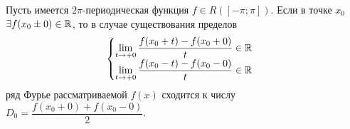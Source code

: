 \documentclass[../../main.tex]{subfiles}
\begin{document}
\begin{crl*}
	Пусть имеется $2\pi$-периодическая функция $f\in R([-\pi;\pi])$.
	Если в точке $x_0$ $\exists f(x_0 \pm 0) \in \mathbb{R}$, то в
	случае существования пределов
	\begin{equation}
		\label{18:12}
		\begin{cases}
			\lim\limits_{t \rightarrow +0}{\dfrac
				{f(x_0 + t) - f(x_0 + 0)}{t}} \in \mathbb{R}\\
			\lim\limits_{t \rightarrow +0}{\dfrac
				{f(x_0 - t) - f(x_0 - 0)}{t}} \in \mathbb{R}\\ 
		\end{cases}
	\end{equation}
	ряд Фурье рассматриваемой $f(x)$ сходится к числу
	$D_0 = \dfrac{f(x_0 + 0) + f(x_0 - 0)}{2}$.
	
\end{crl*}
\end{document}
